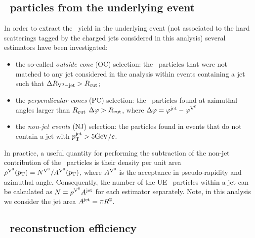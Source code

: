 

\subsection{\Vzero\ particles from the underlying event}
\label{sec:V0UE}

In order to extract the \Vzero\ yield in the underlying event (not associated to the hard scatterings tagged by the charged jets considered in this analysis) several estimators have been investigated:
\begin{itemize}
  \item the so-called {\it outside cone} (OC) selection: the \Vzero\ particles that were not matched to any jet considered in the analysis within events containing a jet such that $\Delta R_{{\rm V}^{0}-{\rm jet}} > R_{\rm cut}$;
  \item the {\it perpendicular cones} (PC) selection: the \Vzero\ particles found at azimuthal angles larger than $R_{\rm cut}$ $\Delta \varphi > R_{\rm cut}$, where $\Delta \varphi= \varphi^{\rm jet} - \varphi^{{\rm V}^{0}}$  
  \item the {\it non-jet events } (NJ) selection: the \Vzero particles found in events that do not contain a jet with $p_{\mathrm{T}}^{\mathrm{jet}}>5 \mathrm{GeV}/c$.
\end{itemize}

In practice, a useful quantity for performing the subtraction of the non-jet contribution of the \Vzero\ particles is their density per unit area $\rho^{{\rm V}^{0}}(p_{\mathrm{T}})=N^{{\rm V}^{0}}/A^{{\rm V}^{0}}(p_{\mathrm{T}})$, where $A^{{\rm V}^{0}}$ is the acceptance in pseudo-rapidity and azimuthal angle. Consequently, the number of the UE \Vzero\ particles within a jet can be calculated as $N=\rho^{{\rm V}^{0}} A^{\mathrm{jet}}$ for each estimator separately. Note, in this analysis we consider the jet area $A^{\mathrm{jet}} = \pi R^2$.


\subsection{\Vzero\ reconstruction efficiency}
\label{sec:c05V0EffiMC}

